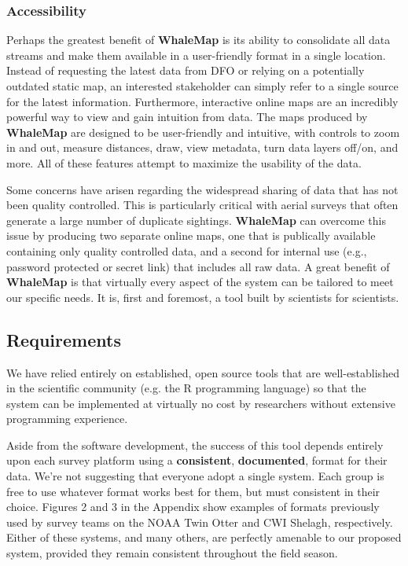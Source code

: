 \documentclass[11pt, letterpaper]{article}
\begin{document}
\subsubsection{Accessibility}

Perhaps the greatest benefit of \textbf{WhaleMap} is its ability to consolidate all data streams and make them available in a user-friendly format in a single location. Instead of requesting the latest data from DFO or relying on a potentially outdated static map, an interested stakeholder can simply refer to a single source for the latest information. Furthermore, interactive online maps are an incredibly powerful way to view and gain intuition from data. The maps produced by \textbf{WhaleMap} are designed to be user-friendly and intuitive, with controls to zoom in and out, measure distances, draw, view metadata, turn data layers off/on, and more. All of these features attempt to maximize the usability of the data. 

Some concerns have arisen regarding the widespread sharing of data that has not been quality controlled. This is particularly critical with aerial surveys that often generate a large number of duplicate sightings. \textbf{WhaleMap} can overcome this issue by producing two separate online maps, one that is publically available containing only quality controlled data, and a second for internal use (e.g., password protected or secret link) that includes all raw data. A great benefit of \textbf{WhaleMap} is that virtually every aspect of the system can be tailored to meet our specific needs. It is, first and foremost, a tool built by scientists for scientists. 

\subsection{Requirements}

We have relied entirely on established, open source tools that are well-established in the scientific community (e.g. the R programming language) so that the system can be implemented at virtually no cost by researchers without extensive programming experience.

Aside from the software development, the success of this tool depends entirely upon each survey platform using a \textbf{consistent}, \textbf{documented}, format for their data. We're not suggesting that everyone adopt a single system. Each group is free to use whatever format works best for them, but must consistent in their choice. Figures 2 and 3 in the Appendix show examples of formats previously used by survey teams on the NOAA Twin Otter and CWI Shelagh, respectively. Either of these systems, and many others, are perfectly amenable to our proposed system, provided they remain consistent throughout the field season.
\end{document}
